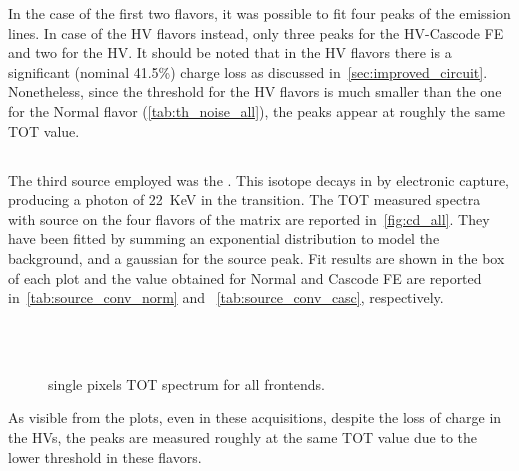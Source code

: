 In the case of the first two flavors, it was possible to fit four peaks of the emission lines. In case of the HV flavors instead, only three peaks for the HV-Cascode FE and two for the HV. It should be noted that in the HV flavors there is a significant (nominal 41.5\%) charge loss as discussed in~\autoref{sec:improved_circuit}. Nonetheless, since the threshold for the HV flavors is much smaller than the one for the Normal flavor (\autoref{tab:th_noise_all}), the peaks appear at roughly the same TOT value.



\subsection{}

The third source employed was the . This isotope decays in  by electronic capture, producing a photon of \SI{22}{KeV} in the transition. The TOT measured spectra with  source on the four flavors of the matrix are reported in~\autoref{fig:cd_all}. They have been fitted by summing an exponential distribution to model the background, and a gaussian for the source peak. Fit results are shown in the box of each plot and the value obtained for Normal and Cascode FE are reported in~\autoref{tab:source_conv_norm} and ~\autoref{tab:source_conv_casc}, respectively. 


\begin{figure}[h!]
\centering
{}\quad
{}\\
\quad
{}\\
\caption{ single pixels TOT spectrum for all frontends.}
\label{fig:cd_all}
\end{figure}

As visible from the plots, even in these acquisitions, despite the loss of charge in the HVs, the peaks are measured roughly at the same TOT value due to the lower threshold in these flavors.
\clearpage

